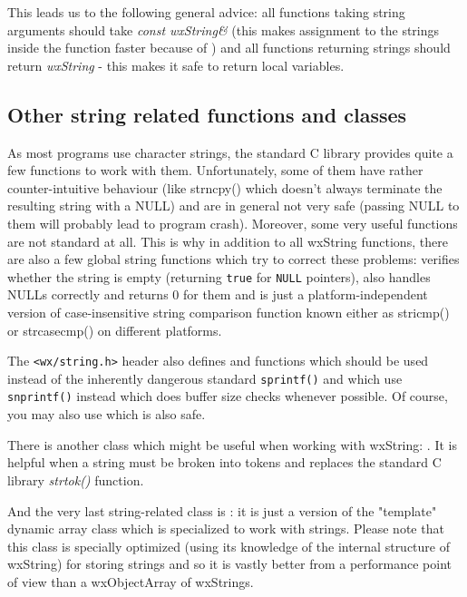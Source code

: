 This leads us to the following general advice: all functions taking string
arguments should take {\it const wxString\&} (this makes assignment to the
strings inside the function faster because of 
) and all functions returning
strings should return {\it wxString} - this makes it safe to return local
variables.

\subsection{Other string related functions and classes}\label{relatedtostring}

As most programs use character strings, the standard C library provides quite
a few functions to work with them. Unfortunately, some of them have rather
counter-intuitive behaviour (like strncpy() which doesn't always terminate the
resulting string with a NULL) and are in general not very safe (passing NULL
to them will probably lead to program crash). Moreover, some very useful
functions are not standard at all. This is why in addition to all wxString
functions, there are also a few global string functions which try to correct
these problems:  verifies whether the string
is empty (returning {\tt true} for {\tt NULL} pointers), 
 also handles NULLs correctly and returns 0 for
them and  is just a platform-independent
version of case-insensitive string comparison function known either as
stricmp() or strcasecmp() on different platforms.

The {\tt <wx/string.h>} header also defines  
and  functions which should be used instead
of the inherently dangerous standard {\tt sprintf()} and which use {\tt
snprintf()} instead which does buffer size checks whenever possible. Of
course, you may also use  which is
also safe.

There is another class which might be useful when working with wxString: 
. It is helpful when a string must
be broken into tokens and replaces the standard C library {\it
strtok()} function.

And the very last string-related class is : it
is just a version of the "template" dynamic array class which is specialized to work
with strings. Please note that this class is specially optimized (using its
knowledge of the internal structure of wxString) for storing strings and so it is
vastly better from a performance point of view than a wxObjectArray of wxStrings.

